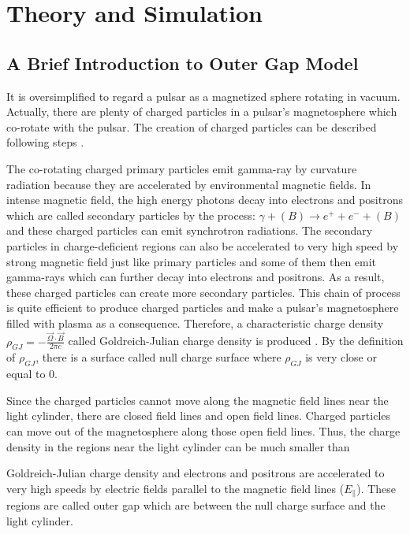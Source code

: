 \documentclass[12pt]{report}
\newcommand{\gj}[0]{
  Goldreich-Julian charge density
}
\begin{document}
    \chapter{Theory and Simulation}
      \section{A Brief Introduction to Outer Gap Model}
        It is oversimplified to regard a pulsar as a magnetized sphere rotating in vacuum. 
        Actually, there are plenty of charged particles in a pulsar's magnetosphere 
        which co-rotate with the pulsar. The creation of charged particles can 
        be described following steps \cite{Sturrock:1971zc}.

        The co-rotating charged primary particles emit gamma-ray by curvature 
        radiation because they are accelerated by environmental magnetic fields.  
        In intense magnetic field, the high energy photons decay into electrons and 
        positrons which are called secondary particles by the process: 
        $\gamma + (B) \rightarrow e^++e^-+(B)$ and these charged particles can emit 
        synchrotron radiations. The secondary particles in charge-deficient regions can also 
        be accelerated to very high speed by strong magnetic field just like primary particles 
        and some of them then emit gamma-rays which can further decay into electrons and 
        positrons. As a result, these charged particles can create more secondary particles.
        This chain of process is quite efficient to produce charged particles and 
        make a pulsar's magnetosphere filled with plasma as a consequence. Therefore, a 
        characteristic charge density $\rho_{GJ}=-\frac{\vec{\Omega}\cdot \vec{B}}{2\pi c}$ 
        called Goldreich-Julian charge density is produced \cite{1969ApJ}. By the definition 
        of $\rho_{GJ}$, there is a surface called null charge surface where $\rho_{GJ}$ is 
        very close or equal to $0$. 

        Since the charged particles cannot move along the magnetic field lines near 
        the light cylinder, there are closed field lines and open field lines. Charged 
        particles can move out of the magnetosphere along those open field lines. Thus, the 
        charge density in the regions near the light cylinder can be much smaller than 
        \gj{} and electrons and positrons are accelerated to very high speeds by electric 
        fields parallel to the magnetic field lines ($E_{\parallel}$). These regions are called 
        outer gap which are between the null charge surface and the light cylinder.
        \cite{1986ApJ...300..500C} 
        
\end{document}
